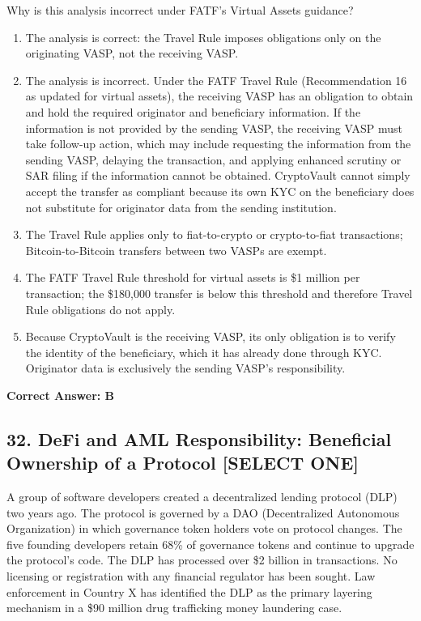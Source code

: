\documentclass[11pt,a4paper]{article}
\begin{document}
	Why is this analysis incorrect under FATF's Virtual Assets guidance?
	
	\begin{enumerate}[label=\Alph*.]
		\item The analysis is correct: the Travel Rule imposes obligations only on the originating VASP, not the receiving VASP.
		\item The analysis is incorrect. Under the FATF Travel Rule (Recommendation 16 as updated for virtual assets), the receiving VASP has an obligation to obtain and hold the required originator and beneficiary information. If the information is not provided by the sending VASP, the receiving VASP must take follow-up action, which may include requesting the information from the sending VASP, delaying the transaction, and applying enhanced scrutiny or SAR filing if the information cannot be obtained. CryptoVault cannot simply accept the transfer as compliant because its own KYC on the beneficiary does not substitute for originator data from the sending institution.
		\item The Travel Rule applies only to fiat-to-crypto or crypto-to-fiat transactions; Bitcoin-to-Bitcoin transfers between two VASPs are exempt.
		\item The FATF Travel Rule threshold for virtual assets is \$1 million per transaction; the \$180,000 transfer is below this threshold and therefore Travel Rule obligations do not apply.
		\item Because CryptoVault is the receiving VASP, its only obligation is to verify the identity of the beneficiary, which it has already done through KYC. Originator data is exclusively the sending VASP's responsibility.
	\end{enumerate}
	\textbf{Correct Answer: B}
	
	\subsection{32. DeFi and AML Responsibility: Beneficial Ownership of a Protocol \textnormal{[SELECT ONE]}}
	
	A group of software developers created a decentralized lending protocol (DLP) two years ago. The protocol is governed by a DAO (Decentralized Autonomous Organization) in which governance token holders vote on protocol changes. The five founding developers retain 68\% of governance tokens and continue to upgrade the protocol's code. The DLP has processed over \$2 billion in transactions. No licensing or registration with any financial regulator has been sought. Law enforcement in Country X has identified the DLP as the primary layering mechanism in a \$90 million drug trafficking money laundering case.
	
\end{document}

